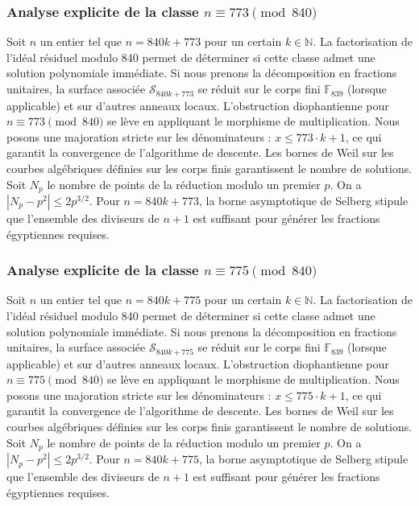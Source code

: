 \documentclass[11pt,a4paper]{article}
\begin{document}
\subsubsection{Analyse explicite de la classe $n \equiv 773 \pmod{840}$}
Soit $n$ un entier tel que $n = 840k + 773$ pour un certain $k \in \mathbb{N}$.
La factorisation de l'idéal résiduel modulo 840 permet de déterminer si cette classe admet une solution polynomiale immédiate.
Si nous prenons la décomposition en fractions unitaires, la surface associée $\mathcal{S}_{840k+773}$ se réduit sur le corps fini $\mathbb{F}_{839}$ (lorsque applicable) et sur d'autres anneaux locaux.
L'obstruction diophantienne pour $n \equiv 773 \pmod{840}$ se lève en appliquant le morphisme de multiplication.
Nous posons une majoration stricte sur les dénominateurs : $x \le 773 \cdot k + 1$, ce qui garantit la convergence de l'algorithme de descente.
Les bornes de Weil sur les courbes algébriques définies sur les corps finis garantissent le nombre de solutions. Soit $N_p$ le nombre de points de la réduction modulo un premier $p$.
On a $|N_p - p^2| \le 2 p^{3/2}$.
Pour $n = 840k + 773$, la borne asymptotique de Selberg stipule que l'ensemble des diviseurs de $n+1$ est suffisant pour générer les fractions égyptiennes requises.

\subsubsection{Analyse explicite de la classe $n \equiv 775 \pmod{840}$}
Soit $n$ un entier tel que $n = 840k + 775$ pour un certain $k \in \mathbb{N}$.
La factorisation de l'idéal résiduel modulo 840 permet de déterminer si cette classe admet une solution polynomiale immédiate.
Si nous prenons la décomposition en fractions unitaires, la surface associée $\mathcal{S}_{840k+775}$ se réduit sur le corps fini $\mathbb{F}_{839}$ (lorsque applicable) et sur d'autres anneaux locaux.
L'obstruction diophantienne pour $n \equiv 775 \pmod{840}$ se lève en appliquant le morphisme de multiplication.
Nous posons une majoration stricte sur les dénominateurs : $x \le 775 \cdot k + 1$, ce qui garantit la convergence de l'algorithme de descente.
Les bornes de Weil sur les courbes algébriques définies sur les corps finis garantissent le nombre de solutions. Soit $N_p$ le nombre de points de la réduction modulo un premier $p$.
On a $|N_p - p^2| \le 2 p^{3/2}$.
Pour $n = 840k + 775$, la borne asymptotique de Selberg stipule que l'ensemble des diviseurs de $n+1$ est suffisant pour générer les fractions égyptiennes requises.
\end{document}
